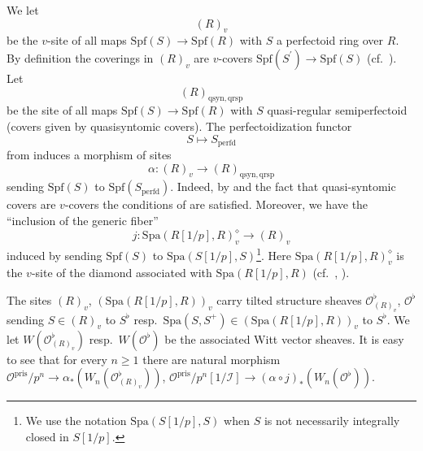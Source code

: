 \documentclass{amsart}
\theoremstyle{plain}
\theoremstyle{definition}
\newcommand{\pris}{\mathrm{pris}}
\newcommand{\Spa}{\mathrm{Spa}}
\newcommand{\Spf}{\mathrm{Spf}}
\newcommand{\red}[1]{{\color{black} #1}}
\begin{document}
We let
$$
(R)_{v}
$$
be the $v$-site of all maps $\Spf(S)\to \Spf(R)$ with $S$ a perfectoid ring over $R$. By definition the coverings in $(R)_v$ are $v$-covers $\Spf(S^\prime)\to \Spf(S)$ (cf.\  \cite[Section 8.1]{bhatt_scholze_prisms_and_prismatic_cohomology}).
Let
$$
(R)_{\mathrm{qsyn},\mathrm{qrsp}}
$$
be the site of all maps $\Spf(S)\to \Spf(R)$ with $S$ quasi-regular semiperfectoid (covers given by quasisyntomic covers). The perfectoidization functor
$$
S\mapsto S_{\mathrm{perfd}}
$$
from \cite[Definition 8.2]{bhatt_scholze_prisms_and_prismatic_cohomology} induces a \red{morphism of sites}
$$
\alpha\colon (R)_{v}\to (R)_{\mathrm{qsyn},\mathrm{qrsp}}
$$
sending $\Spf(S)$ to $\Spf(S_{\mathrm{perfd}})$. Indeed, by \cite[Proposition 8.10]{bhatt_scholze_prisms_and_prismatic_cohomology} and the fact that quasi-syntomic covers are $v$-covers the conditions of \cite[Tag 00WV]{stacks_project} are satisfied. 
Moreover, we have the ``inclusion of the generic fiber''
$$
j\colon \Spa(R[1/p],R)_{v}^\diamond\to (R)_v
$$
induced by sending $\Spf(S)$ to $\Spa(S[1/p],S)$\footnote{We use the notation $\Spa(S[1/p],S)$ when $S$ is not necessarily integrally closed in $S[1/p]$.}. Here $\Spa(R[1/p],R)^\diamond_v$ is the $v$-site of the diamond associated with $\Spa(R[1/p],R)$ (cf.\ \cite[Section 15.1]{scholze_etale_cohomology_of_diamonds}, \cite[Definition 14.1.iii)]{scholze_etale_cohomology_of_diamonds}).

\red{The sites $(R)_v$, $(\Spa(R[1/p],R))_v$ carry tilted structure sheaves $\mathcal{O}^\flat_{(R)_v}$, $\mathcal{O}^\flat$ sending $S\in (R)_v$ to $S^\flat$ resp.\ $\Spa(S,S^+)\in (\Spa(R[1/p],R))_v$ to $S^\flat$. We let $W(\mathcal{O}^\flat_{(R)_v})$ resp.\ $W(\mathcal{O}^\flat)$ be the associated Witt vector sheaves. It is easy to see that for every $n\geq 1$ there are natural morphism $\mathcal{O}^{\mathrm{pris}}/p^n\to \alpha_\ast(W_n(\mathcal{O}^{\flat}_{(R)_v}))$, $\mathcal{O}^\pris/p^n[1/\mathcal{I}]\to (\alpha\circ j)_{\ast}(W_n(\mathcal{O}^\flat))$. }
\end{document}
